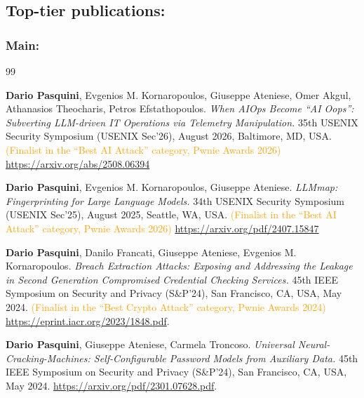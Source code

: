 \documentclass[10pt]{article} %
\begin{document}
\ifml
\subsection*{Top-tier publications:}
\vspace{.5cm}
\else
\subsubsection{Main:}
\fi


\begin{thebibliography}{99}



	\textbf{Dario Pasquini},  Evgenios M. Kornaropoulos, Giuseppe Ateniese, Omer Akgul, Athanasios Theocharis, Petros Efstathopoulos. \textit{When AIOps Become ``AI Oops'': Subverting LLM-driven IT Operations via Telemetry Manipulation.} 35th USENIX Security Symposium (USENIX Sec'26), August 2026, Baltimore, MD, USA. \textcolor{orange}{(Finalist in the ``Best AI Attack'' category, Pwnie Awards 2026)} \url{https://arxiv.org/abs/2508.06394}
	

	\textbf{Dario Pasquini},  Evgenios M. Kornaropoulos, Giuseppe Ateniese. \textit{LLMmap: Fingerprinting for Large Language Models.} 34th USENIX Security Symposium (USENIX Sec'25), August 2025, Seattle, WA, USA. \textcolor{orange}{(Finalist in the ``Best AI Attack'' category, Pwnie Awards 2026)} \url{https://arxiv.org/pdf/2407.15847}

\textbf{Dario Pasquini}, Danilo Francati, Giuseppe Ateniese, Evgenios M. Kornaropoulos.
\textit{Breach Extraction Attacks: Exposing and Addressing the Leakage in Second Generation Compromised Credential Checking Services.}
45th IEEE Symposium on Security and Privacy (S\&P'24), San Francisco, CA, USA, May 2024. \textcolor{orange}{(Finalist in the ``Best Crypto Attack'' category, Pwnie Awards 2024)} \url{https://eprint.iacr.org/2023/1848.pdf}. 

\textbf{Dario Pasquini}, Giuseppe Ateniese,  Carmela Troncoso. \textit{Universal Neural-Cracking-Machines: Self-Configurable Password Models from Auxiliary Data.} 45th IEEE Symposium on Security and Privacy (S\&P'24), San Francisco, CA, USA, May 2024. \url{https://arxiv.org/pdf/2301.07628.pdf}. 


\end{thebibliography}
\end{document}
